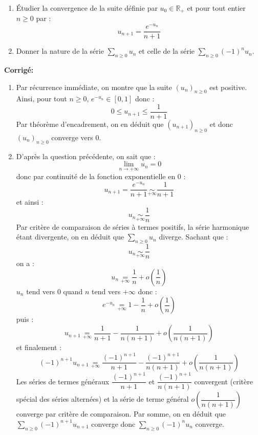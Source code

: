 \documentclass[a4paper,twoside,french,10pt]{VcCours}
\newcommand{\corr}{\textbf{Corrigé:}}
\newcommand{\Sum}[2]{\ensuremath{\textstyle{\sum\limits_{#1}^{#2}}}}
\begin{document}
\medskip

\begin{Exercice}{}  
\begin{enumerate}
\item Étudier la convergence de la suite définie par $u_0 \in \mathbb{R}_+$ et pour tout entier $n \geq 0$ par :
 \[
u_{n + 1} = \frac{e^{ - u_n}}{n + 1}
 \]
\item Donner la nature de la série $\Sum{n \geq 0}{} u_n$ et celle de la série $\Sum{n \geq 0}{} (-1)^n u_n$.
\end{enumerate}
\end{Exercice}

\corr 

\begin{enumerate}
\item Par récurrence immédiate, on montre que la suite $(u_n)_{n \geq 0}$ est positive. Ainsi, pour tout $n \geq 0$, $e^{-u_n} \in [0,1]$ donc :
$$ 0 \leq u_{n+1} \leq \dfrac{1}{n+1}$$
Par théorème d'encadrement, on en déduit que $(u_{n+1})_{n \geq 0}$ et donc $(u_n)_{n \geq 0}$ converge vers $0$.
\item D'après la question précédente, on sait que :
$$ \lim_{n \rightarrow + \infty} u_n = 0$$
donc par continuité de la fonction exponentielle en $0$ :
$$ u_{n+1} = \dfrac{e^{-u_n}}{n+1} \underset{+ \infty}{\sim} \dfrac{1}{n+1}$$
et ainsi :
$$ u_n \underset{+ \infty}{\sim} \dfrac{1}{n}$$
Par critère de comparaison de séries à termes positifs, la série harmonique étant divergente, on en déduit que $\Sum{n \geq 0}{} u_n$ diverge. Sachant que :
$$  u_n \underset{+ \infty}{\sim} \dfrac{1}{n}$$
on a :
$$ u_n \underset{+\infty}{=} \dfrac{1}{n} + o \left( \dfrac{1}{n} \right)$$
$u_n$ tend vers $0$ quand $n$ tend vers $+ \infty$ donc :
$$ e^{-u_n} \underset{+\infty}{=} 1 -\dfrac{1}{n} + o \left( \dfrac{1}{n} \right)$$
puis :
$$ u_{n+1} \underset{+\infty}{=} \dfrac{1}{n+1} - \dfrac{1}{n(n+1)} + o \left( \dfrac{1}{n(n+1)} \right)$$
et finalement :
$$ (-1)^{n+1} u_{n+1} \underset{+\infty}{=} \dfrac{(-1)^{n+1}}{n+1} - \dfrac{(-1)^{n+1}}{n(n+1)} + o \left( \dfrac{1}{n(n+1)} \right)$$
Les séries de termes généraux $\dfrac{(-1)^{n+1}}{n+1}$ et $\dfrac{(-1)^{n+1}}{n(n+1)}$ convergent (critère spécial des séries alternées) et la série de terme général $o \left( \dfrac{1}{n(n+1)} \right)$ converge par critère de comparaison. Par somme, on en déduit que $\Sum{n \geq 0}{} (-1)^{n+1} u_{n+1}$ converge donc $\Sum{n \geq 0}{} (-1)^n u_n$ converge.
\end{enumerate}
\end{document}
